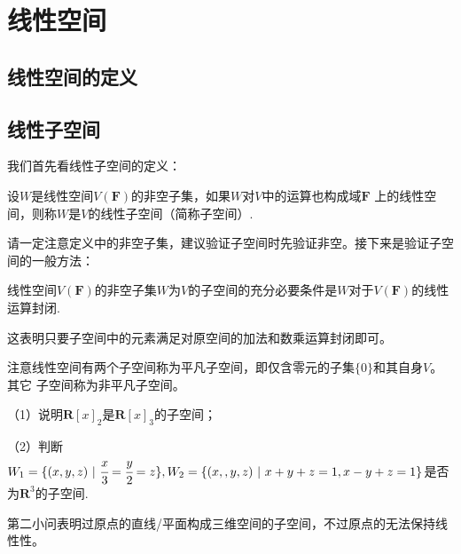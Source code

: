 \chapter{线性空间}

\section{线性空间的定义}

\section{线性子空间}
我们首先看线性子空间的定义：
\begin{definition}
	设$W$是线性空间$V(\mathbf{F})$的非空子集，如果$W$对$V$中的运算也构成域$\mathbf{F}$
	上的线性空间，则称$W$是$V$的线性子空间（简称子空间）.
\end{definition}
请一定注意定义中的非空子集，建议验证子空间时先验证非空。接下来是验证子空间的一般方法：
\begin{theorem}
	线性空间$V(\mathbf{F})$的非空子集$W$为$V$的子空间的充分必要条件是$W$对于$V(\mathbf{F})$的线性运算封闭.
\end{theorem}
这表明只要子空间中的元素满足对原空间的加法和数乘运算封闭即可。

注意线性空间有两个子空间称为平凡子空间，即仅含零元的子集$\{0\}$和其自身$V$。其它
子空间称为非平凡子空间。
\begin{example}
	\textup{（1）}说明$\mathbf{R}[x]_2$是$\mathbf{R}[x]_3$的子空间\textup{；}

	\textup{（2）}判断$W_1=\{(x,y,z)\ |\ \cfrac{x}{3}=\cfrac{y}{2}=z\},
	W_2=\{(x,,y,z)\ |\ x+y+z=1,x-y+z=1\}$是否为$\mathbf{R}^3$的子空间.
\end{example}
第二小问表明过原点的直线/平面构成三维空间的子空间，不过原点的无法保持线性性。

